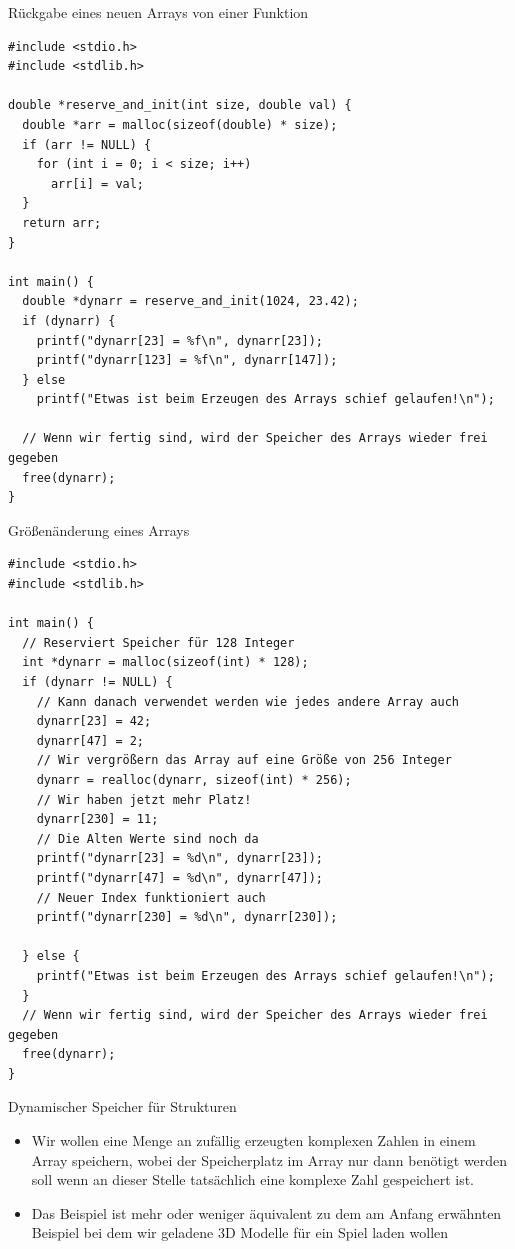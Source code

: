 \documentclass[presentation]{beamer}
\begin{document}
\begin{frame}[label={sec:org9b0bd05},fragile]{Rückgabe eines neuen Arrays von einer Funktion}
 \begin{verbatim}
#include <stdio.h>
#include <stdlib.h>

double *reserve_and_init(int size, double val) {
  double *arr = malloc(sizeof(double) * size);
  if (arr != NULL) {
    for (int i = 0; i < size; i++)
      arr[i] = val;
  }
  return arr;
}

int main() {
  double *dynarr = reserve_and_init(1024, 23.42);
  if (dynarr) {
    printf("dynarr[23] = %f\n", dynarr[23]);
    printf("dynarr[123] = %f\n", dynarr[147]);
  } else
    printf("Etwas ist beim Erzeugen des Arrays schief gelaufen!\n");

  // Wenn wir fertig sind, wird der Speicher des Arrays wieder frei gegeben
  free(dynarr);
}
\end{verbatim}
\end{frame}

\begin{frame}[label={sec:orgcb4e76a},fragile]{Größenänderung eines Arrays}
 \begin{verbatim}
#include <stdio.h>
#include <stdlib.h>

int main() {
  // Reserviert Speicher für 128 Integer
  int *dynarr = malloc(sizeof(int) * 128);
  if (dynarr != NULL) {
    // Kann danach verwendet werden wie jedes andere Array auch
    dynarr[23] = 42;
    dynarr[47] = 2;
    // Wir vergrößern das Array auf eine Größe von 256 Integer
    dynarr = realloc(dynarr, sizeof(int) * 256);
    // Wir haben jetzt mehr Platz!
    dynarr[230] = 11;
    // Die Alten Werte sind noch da
    printf("dynarr[23] = %d\n", dynarr[23]);
    printf("dynarr[47] = %d\n", dynarr[47]);
    // Neuer Index funktioniert auch
    printf("dynarr[230] = %d\n", dynarr[230]);

  } else {
    printf("Etwas ist beim Erzeugen des Arrays schief gelaufen!\n");
  }
  // Wenn wir fertig sind, wird der Speicher des Arrays wieder frei gegeben
  free(dynarr);
}
\end{verbatim}
\end{frame}
\begin{frame}[label={sec:org3685ae6}]{Dynamischer Speicher für Strukturen}
\begin{itemize}
\item Wir wollen eine Menge an zufällig erzeugten komplexen Zahlen in
einem Array speichern, wobei der Speicherplatz im Array nur dann
benötigt werden soll wenn an dieser Stelle tatsächlich eine komplexe
Zahl gespeichert ist.
\item Das Beispiel ist mehr oder weniger äquivalent zu dem am Anfang
erwähnten Beispiel bei dem wir geladene 3D Modelle für ein Spiel
laden wollen
\end{itemize}
\end{frame}
\end{document}
